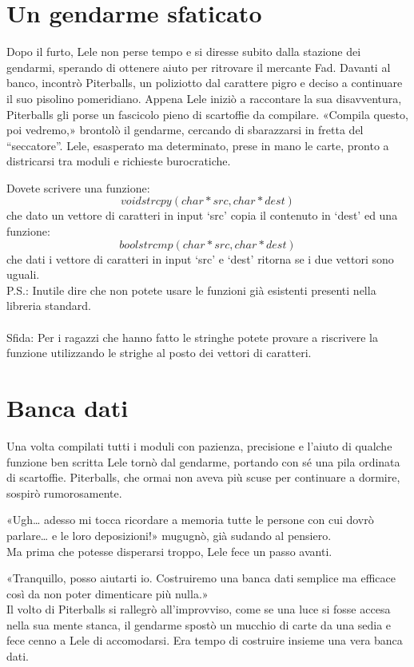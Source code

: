 \documentclass[a4paper]{article}
\begin{document}
\section*{Un gendarme sfaticato}
Dopo il furto, Lele non perse tempo e si diresse subito dalla stazione dei gendarmi, sperando di ottenere aiuto per ritrovare il mercante Fad.
Davanti al banco, incontrò Piterballs, un poliziotto dal carattere pigro e deciso a continuare il suo pisolino pomeridiano. Appena Lele iniziò a raccontare la sua disavventura, Piterballs gli porse un fascicolo pieno di scartoffie da compilare.
«Compila questo, poi vedremo,» brontolò il gendarme, cercando di sbarazzarsi in fretta del “seccatore”.
Lele, esasperato ma determinato, prese in mano le carte, pronto a districarsi tra moduli e richieste burocratiche.

Dovete scrivere una funzione: \begin{equation*}void strcpy(char *src, char *dest)\end{equation*} che dato un vettore di caratteri in input `src' copia il contenuto in `dest' ed una funzione: \begin{equation*}bool strcmp(char *src, char *dest)\end{equation*} che dati i vettore di caratteri in input `src' e `dest' ritorna se i due vettori sono uguali.\\
P.S.: Inutile dire che non potete usare le funzioni già esistenti presenti nella libreria standard.\\
\\
Sfida: Per i ragazzi che hanno fatto le stringhe potete provare a riscrivere la funzione utilizzando le strighe al posto dei vettori di caratteri.

\section*{Banca dati}
Una volta compilati tutti i moduli con pazienza, precisione e l'aiuto di qualche funzione ben scritta Lele tornò dal gendarme, portando con sé una pila ordinata di scartoffie.
Piterballs, che ormai non aveva più scuse per continuare a dormire, sospirò rumorosamente.

«Ugh… adesso mi tocca ricordare a memoria tutte le persone con cui dovrò parlare… e le loro deposizioni!» mugugnò, già sudando al pensiero.\\
Ma prima che potesse disperarsi troppo, Lele fece un passo avanti.

«Tranquillo, posso aiutarti io. Costruiremo una banca dati semplice ma efficace così da non poter dimenticare più nulla.»\\
Il volto di Piterballs si rallegrò all'improvviso, come se una luce si fosse accesa nella sua mente stanca, il gendarme spostò un mucchio di carte da una sedia e fece cenno a Lele di accomodarsi.
Era tempo di costruire insieme una vera banca dati.
\end{document}
